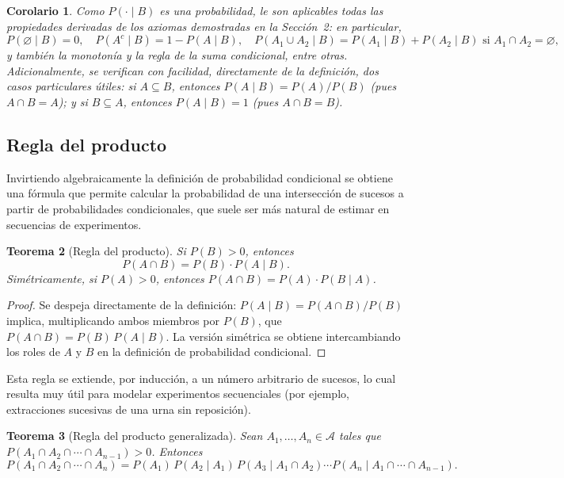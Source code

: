 \documentclass[11pt,a4paper]{article}
\theoremstyle{plain}
\newtheorem{teorema}{Teorema}[section]
\newtheorem{corolario}[teorema]{Corolario}
\theoremstyle{definition}
\theoremstyle{remark}
\begin{document}
\begin{corolario}
Como $P(\cdot\mid B)$ es una probabilidad, le son aplicables \emph{todas} las propiedades derivadas de los axiomas demostradas en la Sección~2: en particular,
\[
P(\varnothing\mid B)=0, \quad P(A^c\mid B)=1-P(A\mid B), \quad P(A_1\cup A_2 \mid B) = P(A_1\mid B)+P(A_2\mid B) \text{ si } A_1\cap A_2=\varnothing,
\]
y también la monotonía y la regla de la suma condicional, entre otras. Adicionalmente, se verifican con facilidad, directamente de la definición, dos casos particulares útiles: si $A \subseteq B$, entonces $P(A\mid B) = P(A)/P(B)$ (pues $A\cap B=A$); y si $B \subseteq A$, entonces $P(A \mid B) = 1$ (pues $A\cap B=B$).
\end{corolario}

\subsection{Regla del producto}

Invirtiendo algebraicamente la definición de probabilidad condicional se obtiene una fórmula que permite calcular la probabilidad de una intersección de sucesos a partir de probabilidades condicionales, que suele ser más natural de estimar en secuencias de experimentos.

\begin{teorema}[Regla del producto]
Si $P(B) > 0$, entonces
\[
P(A \cap B) = P(B)\cdot P(A\mid B).
\]
Simétricamente, si $P(A)>0$, entonces $P(A\cap B) = P(A) \cdot P(B\mid A)$.
\end{teorema}

\begin{proof}
Se despeja directamente de la definición: $P(A\mid B) = P(A\cap B)/P(B)$ implica, multiplicando ambos miembros por $P(B)$, que $P(A\cap B) = P(B)\,P(A\mid B)$. La versión simétrica se obtiene intercambiando los roles de $A$ y $B$ en la definición de probabilidad condicional.
\end{proof}

Esta regla se extiende, por inducción, a un número arbitrario de sucesos, lo cual resulta muy útil para modelar experimentos secuenciales (por ejemplo, extracciones sucesivas de una urna sin reposición).

\begin{teorema}[Regla del producto generalizada]
Sean $A_1,\dots,A_n \in \mathcal{A}$ tales que $P(A_1\cap A_2 \cap \cdots \cap A_{n-1}) > 0$. Entonces
\[
P(A_1\cap A_2\cap\cdots\cap A_n) = P(A_1)\,P(A_2\mid A_1)\,P(A_3\mid A_1\cap A_2)\cdots P(A_n \mid A_1\cap\cdots\cap A_{n-1}).
\]
\end{teorema}
\end{document}
